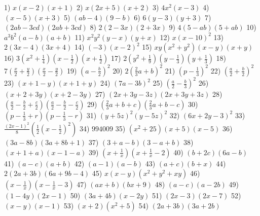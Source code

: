 \documentclass{article}
\begin{document}
	{\footnotesize 1) $x(x-2)(x+1)$} {\footnotesize 2) $x(2x+5)(x+2)$} {\footnotesize 3) $4x^2(x-3)$} {\footnotesize 4) $(x-5)(x+3)$} {\footnotesize 5) $(ab-4)(9-b)$} {\footnotesize 6) $6(y-3)(y+3)$} {\footnotesize 7) $(2ab-3cd)(2ab+3cd)$} {\footnotesize 8) $2(2-3x)(2+3x)$} {\footnotesize 9) $4(5-ab)(5+ab)$} {\footnotesize 10) $a^3b^2(a-b)(a+b)$} {\footnotesize 11) $x^2y^2(y-x)(y+x)$} {\footnotesize 12) $x(x-10)^2$} {\footnotesize 13) $2(3x-4)(3x+4)$} {\footnotesize 14) $(-3)(x-2)^2$} {\footnotesize 15) $xy(x^2+y^2)(x-y)(x+y)$} {\footnotesize 16) $3\left(x^2+\frac{1}{4}\right)\left(x-\frac{1}{2}\right)\left(x+\frac{1}{2}\right)$} {\footnotesize 17) $2\left(y^2+\frac{1}{9}\right)\left(y-\frac{1}{3}\right)\left(y+\frac{1}{3}\right)$} {\footnotesize 18) $7\left(\frac{x}{2}+\frac{y}{2}\right)\left(\frac{x}{2}-\frac{y}{2}\right)$} {\footnotesize 19) $\left(a-\frac{b}{2}\right)^2$} {\footnotesize 20) $2\left(\frac{2}{3}a+b\right)^2$} {\footnotesize 21) $\left(p-\frac{1}{3}\right)^2$} {\footnotesize 22) $\left(\frac{a}{2}+\frac{b}{2}\right)^2$} {\footnotesize 23) $(x+1-y)(x+1+y)$} {\footnotesize 24) $\left(7a-3b\right)^2$} {\footnotesize 25) $\left(\frac{a}{2}-\frac{b}{3}\right)^2$} {\footnotesize 26) $\left(x+2+3y\right)\left(x+2-3y\right)$} {\footnotesize 27) $\left(2x+3y-3z\right)\left(2x+3y+3z\right)$} {\footnotesize 28) $\left(\frac{a}{2}-\frac{b}{2}+\frac{c}{2}\right)\left(\frac{a}{2}-\frac{b}{2}-\frac{c}{2}\right)$} {\footnotesize 29) $\left(\frac{2}{3}a+b+c\right)\left(\frac{2}{3}a+b-c\right)$} {\footnotesize 30) $\left(p-\frac{1}{3}+r\right)\left(p-\frac{1}{3}-r\right)$} {\footnotesize 31) $\left(y+5z\right)^2\left(y-5z\right)^2$} {\footnotesize 32) $\left(6x+2y-3\right)^2$} {\footnotesize 33) $\frac{\left(2x-1\right)^{2}}{8}\left(\frac{1}{2}\left(x-\frac{1}{2}\right)^2\right)$} {\footnotesize 34) $994009$} {\footnotesize 35) $\left(x^2+25\right)(x+5)(x-5)$} {\footnotesize 36) $\left(3a-8b\right)\left(3a+8b+1\right)$} {\footnotesize 37) $\left(3+a-b\right)\left(3-a+b\right)$} {\footnotesize 38) $\left(x+1+a\right)\left(x-1-a\right)$} {\footnotesize 39) $\left(x+\frac{1}{x}\right)\left(x+\frac{1}{x}-2\right)$} {\footnotesize 40) $\left(b+2c\right)\left(6a-b\right)$} {\footnotesize 41) $\left(a-c\right)\left(a+b\right)$} {\footnotesize 42) $(a-1)(a-b)$} {\footnotesize 43) $(a+c)(b+x)$} {\footnotesize 44) $2(2a+3b)(6a+9b-4)$} {\footnotesize 45) $x(x-y)\left(x^2+y^2+xy\right)$} {\footnotesize 46) $(x-\frac{1}{x})(x-\frac{1}{x}-3)$} {\footnotesize 47) $(ax+b)(bx+9)$} {\footnotesize 48) $(a-c)(a-2b)$} {\footnotesize 49) $(1-4y)(2x-1)$} {\footnotesize 50) $(3a+4b)(x-2y)$} {\footnotesize 51) $(2x-3)(2x-7)$} {\footnotesize 52) $(x-y)(x-1)$} {\footnotesize 53) $(x+2)(x^2+5)$} {\footnotesize 54) $(2a+3b)(3a+2b)$}
\end{document}

